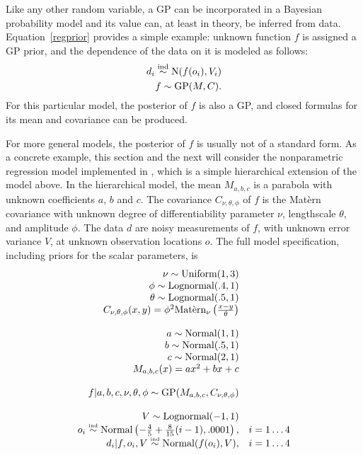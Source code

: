 \documentclass[article]{jss}
\begin{document}
Like any other random variable, a GP can be incorporated in a Bayesian probability model and its value can, at least in theory, be inferred from data. Equation~\ref{regprior} provides a simple example: unknown function $f$ is assigned a GP prior, and the dependence of the data on it is modeled as follows:
\begin{eqnarray*}
    d_i \stackrel{\tiny{\textup{ind}}} {\sim} \textup{N}(f(o_i), V_i)\\
    f \sim \textup{GP}(M,C).
\end{eqnarray*}
For this particular model, the posterior of $f$ is also a GP, and closed formulas for its mean and covariance can be produced.

For more general models, the posterior of $f$ is usually not of a standard form. As a concrete example, this section and the next will consider the nonparametric regression model implemented in , which is a simple hierarchical extension of the model above. In the hierarchical model, the mean $M_{a,b,c}$ is a parabola with unknown coefficients $a$, $b$ and $c$. The covariance $C_{\nu,\theta,\phi}$ of $f$ is the Mat\`ern covariance with unknown degree of differentiability parameter $\nu$, lengthscale $\theta$, and amplitude $\phi$. The data $d$ are noisy measurements of $f$, with unknown error variance $V$, at unknown observation locations $o$. The full model specification, including priors for the scalar parameters, is
\begin{equation}
    \label{eq:simple-example-model} 
    \begin{array}{rr}
    \nu\sim\textup{Uniform}(1,3)&\\
    \phi\sim\textup{Lognormal}(.4,1)&\\
    \theta\sim\textup{Lognormal}(.5,1)&\\
    C_{\nu,\theta,\phi}(x,y) = \phi^2\textup{Mat\`ern}_\nu\left( \frac{x-y}{\theta} \right)&\\
    &\\
    a\sim\textup{Normal}(1,1)&\\
    b\sim\textup{Normal}(.5,1)&\\
    c\sim\textup{Normal}(2,1)&\\
    M_{a,b,c}(x) = ax^2+bx+c&\\
    &\\
    f|a,b,c,\nu,\theta,\phi\sim\textup{GP}(M_{a,b,c}, C_{\nu,\theta,\phi})&\\
    &\\
    V\sim\textup{Lognormal}(-1,1)&\\
    o_i \stackrel{\textup{\tiny ind}}{\sim} \textup{Normal}\left(-\frac{4}{5}+\frac{8}{15}(i-1), .0001\right),&i=1\ldots 4\\
    d_i|f,o_i,V \stackrel{\textup{\tiny ind}}{\sim} \textup{Normal}(f(o_i),V),& i=1\ldots 4
        \end{array}
\end{equation}
\end{document}
